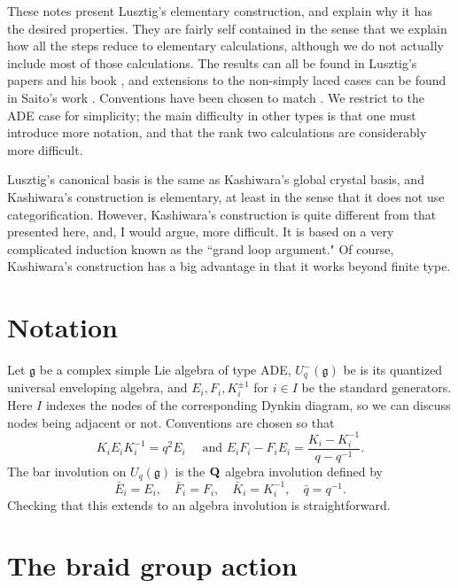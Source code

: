 \documentclass[11pt]{amsart}
\numberwithin{equation}{section}
\theoremstyle{definition}
\newcommand{\g}{\mathfrak{g}}
\begin{document}
These notes present Lusztig's elementary construction, and explain why it has the desired properties. They are fairly self contained in the sense that we explain how all the steps reduce to elementary calculations, although we do not actually include most of those calculations. The results can all be found in Lusztig's papers \cite{L90a,L90b,L90c} and his book \cite[Chapters 41 and 42]{L:1993}, and extensions to the non-simply laced cases can be found in Saito's work \cite{Sai}. Conventions have been chosen to match \cite{Sai}. We restrict to the ADE case for simplicity; the main difficulty in other types is that one must introduce more notation, and that the rank two calculations are considerably more difficult.

Lusztig's canonical basis is the same as Kashiwara's global crystal basis, and Kashiwara's construction is elementary, at least in the sense that it does not use categorification. However, Kashiwara's construction is quite different from that presented here, and, I would argue, more difficult. It is based on a very complicated induction known as the ``grand loop argument." 
Of course, Kashiwara's construction has a big advantage in that it works beyond finite type.

\section{Notation}

Let $\g$ be a complex simple Lie algebra of type ADE, $U_q^-(\g)$ be is its quantized universal enveloping algebra, and $E_i, F_i, K_i^{\pm 1}$ for $i \in I$ be the standard generators. Here $I$ indexes the nodes of the corresponding Dynkin diagram, so we can discuss nodes being adjacent or not. Conventions are chosen so that
$$K_i E_i K_i^{-1} = q^2 E_i \quad \text{ and } E_i F_i - F_i E_i = \frac{K_i-K_i^{-1}}{q-q^{-1}}.$$
The bar involution on $U_q(\g)$ is the ${\bf Q}$ algebra involution defined by
$$\bar E_i=E_i, \quad \bar F_i=F_i, \quad \bar K_i= K_i^{-1}, \quad \bar q= q^{-1}.$$
Checking that this extends to an algebra involution is straightforward. 

\section{The braid group action}
\end{document}

